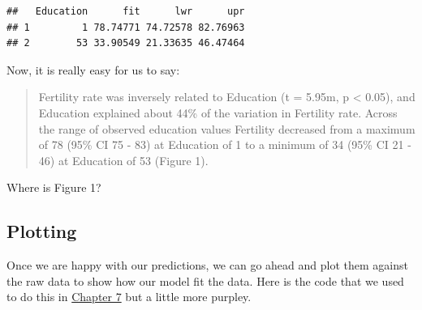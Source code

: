 \documentclass[
]{book}
\newenvironment{Shaded}{\begin{snugshade}}{\end{snugshade}}
\newcommand{\CommentTok}[1]{\textcolor[rgb]{0.56,0.35,0.01}{\textit{#1}}}
\newcommand{\DataTypeTok}[1]{\textcolor[rgb]{0.13,0.29,0.53}{#1}}
\newcommand{\KeywordTok}[1]{\textcolor[rgb]{0.13,0.29,0.53}{\textbf{#1}}}
\newcommand{\NormalTok}[1]{#1}
\newcommand{\OperatorTok}[1]{\textcolor[rgb]{0.81,0.36,0.00}{\textbf{#1}}}
\newcommand{\StringTok}[1]{\textcolor[rgb]{0.31,0.60,0.02}{#1}}
\begin{document}
\begin{Shaded}
\end{Shaded}

\begin{verbatim}
##   Education      fit      lwr      upr
## 1         1 78.74771 74.72578 82.76963
## 2        53 33.90549 21.33635 46.47464
\end{verbatim}

Now, it is really easy for us to say:

\begin{quote}
Fertility rate was inversely related to Education (t = 5.95m, p \textless{} 0.05), and Education explained about 44\% of the variation in Fertility rate. Across the range of observed education values Fertility decreased from a maximum of 78 (95\% CI 75 - 83) at Education of 1 to a minimum of 34 (95\% CI 21 - 46) at Education of 53 (Figure 1).
\end{quote}

Where is Figure 1?

\hypertarget{plotting-1}{%
\subsection{Plotting}\label{plotting-1}}

Once we are happy with our predictions, we can go ahead and plot them against the raw data to show how our model fit the data. Here is the code that we used to do this in \protect\hyperlink{Chapter7}{Chapter 7} but a little more purpley.
\end{document}
